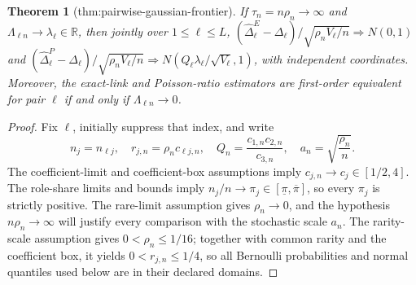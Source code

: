 \documentclass{article}
\newtheorem{theorem}{Theorem}
\begin{document}
\begin{theorem}[thm:pairwise-gaussian-frontier]\label{thm:pairwise-gaussian-frontier}
If \(\tau_n=n\rho_n\to\infty\) and \(\Lambda_{\ell n}\to\lambda_{\ell}\in\mathbb R\), then jointly over \(1\le\ell\le L\), \((\widehat\Delta^E_{\ell}-\Delta_{\ell})/\sqrt{\rho_nV_{\ell}/n}\Rightarrow N(0,1)\) and \((\widehat\Delta^P_{\ell}-\Delta_{\ell})/\sqrt{\rho_nV_{\ell}/n}\Rightarrow N(Q_{\ell}\lambda_{\ell}/\sqrt{V_{\ell}},1)\), with independent coordinates. Moreover, the exact-link and Poisson-ratio estimators are first-order equivalent for pair \(\ell\) if and only if \(\Lambda_{\ell n}\to0\).
\end{theorem}
\begin{proof}
Fix \(\ell\), initially suppress that index, and write
\[
 n_j=n_{\ell j},\quad r_{j,n}=\rho_nc_{\ell j,n},\quad
 Q_n=\frac{c_{1,n}c_{2,n}}{c_{3,n}},\quad
 a_n=\sqrt{\frac{\rho_n}{n}}.
\tag{1}
\]
The coefficient-limit and coefficient-box assumptions imply \(c_{j,n}\to c_j\in[1/2,4]\). The role-share limits and bounds imply \(n_j/n\to\pi_j\in[\underline\pi,\overline\pi]\), so every \(\pi_j\) is strictly positive. The rare-limit assumption gives \(\rho_n\to0\), and the hypothesis \(n\rho_n\to\infty\) will justify every comparison with the stochastic scale \(a_n\).
The rarity-scale assumption gives \(0<\rho_n\leq1/16\); together with common rarity and the coefficient box, it yields \(0<r_{j,n}\leq1/4\), so all Bernoulli probabilities and normal quantiles used below are in their declared domains.


\end{proof}
\end{document}

